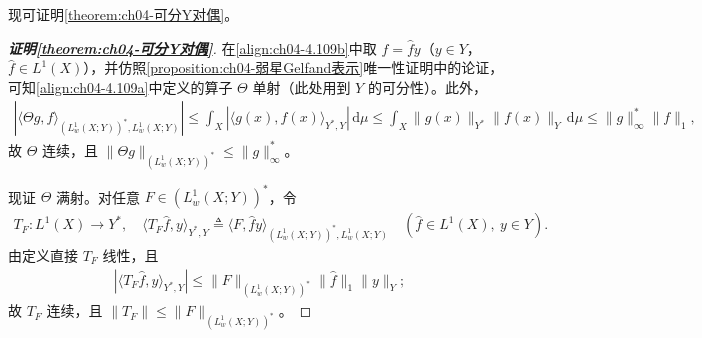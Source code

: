 \documentclass[../../main.tex]{subfiles}%
\begin{document}
现可证明\cref{theorem:ch04-可分Y对偶}。

\begin{proof}[\textbf{证明\cref{theorem:ch04-可分Y对偶}}]
在\eqref{align:ch04-4.109b}中取 $f=\hat fy$（$y\in Y$，$\hat f\in L^1(X)$），并仿照\cref{proposition:ch04-弱星Gelfand表示}唯一性证明中的论证，可知\eqref{align:ch04-4.109a}中定义的算子 $\Theta$ 单射（此处用到 $Y$ 的可分性）。此外，
\begin{align*}
|\langle\Theta g,f\rangle_{(L^1_w(X;Y))^*,L^1_w(X;Y)}|
\leqslant\int_X|\langle g(x),f(x)\rangle_{Y^*,Y}|\,\mathrm{d}\mu
\leqslant\int_X\|g(x)\|_{Y^*}\|f(x)\|_Y\,\mathrm{d}\mu
\leqslant\|g\|_\infty^*\|f\|_1,
\end{align*}
故 $\Theta$ 连续，且 $\|\Theta g\|_{(L^1_w(X;Y))^*}\leqslant\|g\|_\infty^*$。

现证 $\Theta$ 满射。对任意 $F\in(L^1_w(X;Y))^*$，令
\begin{align*}
T_F:L^1(X)\to Y^*,\quad \langle T_F\hat f,y\rangle_{Y^*,Y}\triangleq\langle F,\hat fy\rangle_{(L^1_w(X;Y))^*,L^1_w(X;Y)}\quad(\hat f\in L^1(X),\ y\in Y).
\end{align*}
由定义直接 $T_F$ 线性，且
\begin{align*}
|\langle T_F\hat f,y\rangle_{Y^*,Y}|\leqslant\|F\|_{(L^1_w(X;Y))^*}\|\hat f\|_1\|y\|_Y;
\end{align*}
故 $T_F$ 连续，且 $\|T_F\|\leqslant\|F\|_{(L^1_w(X;Y))^*}$。


\end{proof}
\end{document}
